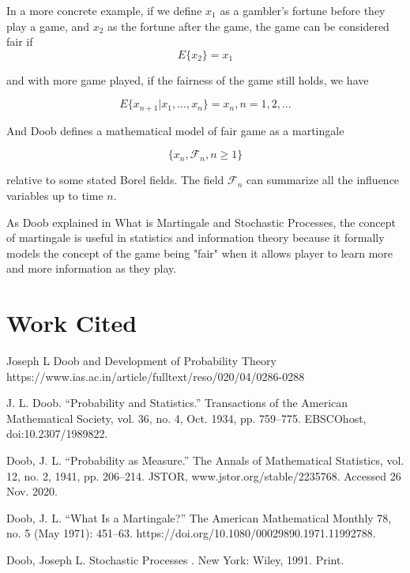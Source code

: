 \documentclass{article}
\begin{document}
In a more concrete example, if we define $x_1$ as a gambler's fortune before they play a game, and $x_2$ as the fortune after the game, the game can be considered fair if
\begin{equation}
	E\{x_2\} = x_1
\end{equation}

and with more game played, if the fairness of the game still holds, we have

\begin{equation}
	E\{x_{n+1} | x_1, ..., x_n\} = x_n, n=1,2,...
\end{equation}

And Doob defines a mathematical model of fair game as a martingale

\begin{equation}
\{x_n, \mathcal{F}_n, n \geq 1 \}
\end{equation}

relative to some stated Borel fields. The field $\mathcal{F}_n$ can summarize all the influence variables up to time $n$.

As Doob explained in What is Martingale and Stochastic Processes, the concept of martingale is useful in statistics and information theory because it formally models the concept of the game being "fair" when it allows player to learn more and more information as they play. 

\section{Work Cited}
Joseph L Doob and Development of Probability Theory https://www.ias.ac.in/article/fulltext/reso/020/04/0286-0288


J. L. Doob. “Probability and Statistics.” Transactions of the American Mathematical Society, vol. 36, no. 4, Oct. 1934, pp. 759–775. EBSCOhost, doi:10.2307/1989822.

Doob, J. L. “Probability as Measure.” The Annals of Mathematical Statistics, vol. 12, no. 2, 1941, pp. 206–214. JSTOR, www.jstor.org/stable/2235768. Accessed 26 Nov. 2020.

Doob, J. L. “What Is a Martingale?” The American Mathematical Monthly 78, no. 5 (May 1971): 451–63. https://doi.org/10.1080/00029890.1971.11992788.


Doob, Joseph L. Stochastic Processes . New York: Wiley, 1991. Print.
\end{document}
